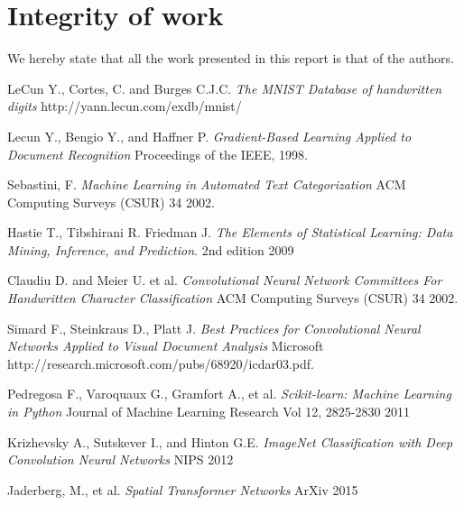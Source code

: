 \documentclass[conference]{IEEEtran}
\begin{document}
\section{Integrity of work}
We hereby state that all the work presented in this report is that of the authors.
\begin{thebibliography}{9}

LeCun Y., Cortes, C. and Burges C.J.C.
	\emph{The MNIST Database of handwritten digits}
	http://yann.lecun.com/exdb/mnist/


Lecun Y., Bengio Y., and Haffner P.
 \emph{Gradient-Based Learning Applied to Document Recognition}
 Proceedings of the IEEE,
 1998.

 
 Sebastini, F.
  \emph{Machine Learning in Automated Text Categorization}
  ACM Computing Surveys (CSUR) 34
  2002.

 Hastie T., Tibshirani R. Friedman J.
 \emph{The Elements of 
Statistical Learning: Data Mining, Inference, and Prediction}.
2nd edition
2009


 Claudiu D. and Meier U. et al.
  \emph{Convolutional Neural Network Committees For Handwritten Character
Classification}
  ACM Computing Surveys (CSUR) 34
  2002.

  
  Simard F., Steinkraus D., Platt J.
  \emph{Best Practices for Convolutional Neural Networks
Applied to Visual Document Analysis}
	Microsoft
    http://research.microsoft.com/pubs/68920/icdar03.pdf.


Pedregosa F., Varoquaux G., Gramfort A., et al.
\emph{Scikit-learn: Machine Learning in {P}ython}
Journal of Machine Learning Research    
Vol 12, 2825-2830 2011   
       

Krizhevsky A., Sutskever I., and Hinton G.E.
\emph{ImageNet Classification with Deep Convolution Neural Networks}
	NIPS 2012


 Jaderberg, M., et al.
  \emph{Spatial Transformer Networks}
  ArXiv
  2015

\end{thebibliography}
\end{document}
